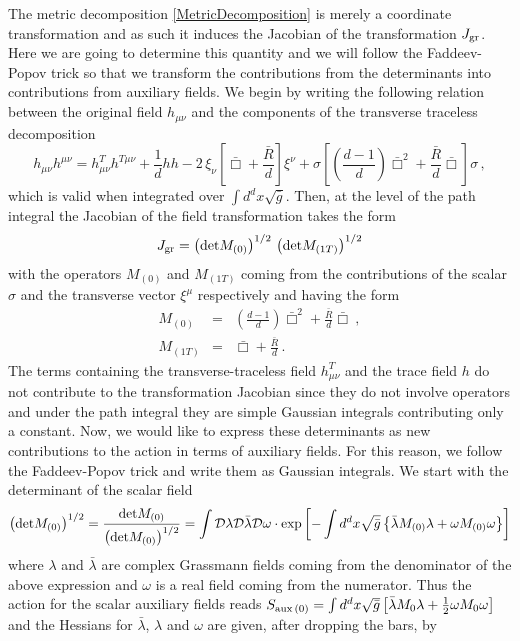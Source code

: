 \documentclass[notitlepage,eqsecnum,bm,amsmath,preprintnumbers,superscriptaddress,nofootinbib,aps,11pt]{revtex4-1}
\begin{document}
The metric decomposition \eqref{MetricDecomposition} is merely a coordinate transformation and as such it induces the Jacobian of the transformation $J_{\rm gr}$. Here we are going to determine this quantity and we will follow the Faddeev-Popov trick so that we transform the contributions from the determinants into contributions from auxiliary fields. We begin by writing the following relation between the original field $h_{\mu\nu}$ and the components of the transverse traceless decomposition 
\begin{equation}
h_{\mu\nu}h^{\mu\nu} = 
h^T_{\mu\nu}h^{T\mu\nu}+\frac{1}{d}hh - 2\,\xi_{\nu}\left[\bar \Box + \frac{\bar R}{d}\right]\xi^{\nu}+\sigma \left[\left(\frac{d-1}{d}\right)\bar \Box^2+\frac{\bar R}{d}\bar \Box\right]\sigma\,,
\end{equation}
which is valid when integrated over $\int d^dx \sqrt{\bar g}$. Then, at the level of the path integral the Jacobian of the field transformation takes the form
\begin{equation}
J_{\rm gr}=\left({\rm det} M_{(0)}\right)^{1/2}\,\left({\rm det} M_{(1T)}\right)^{1/2}
\end{equation}
with the operators $M_{(0)}$ and $M_{(1T)}$ coming from the contributions of the scalar $\sigma$ and the transverse vector $\xi^{\mu}$ respectively and having the form
\begin{eqnarray}
M_{(0)}&=&\left(\frac{d-1}{d}\right)\bar \Box^2+\frac{\bar R}{d}\bar \Box \ ,\\
M_{(1T)}&=&\bar \Box + \frac{\bar R}{d}\,.
\end{eqnarray}
The terms containing the transverse-traceless field $h^{T}_{\mu\nu}$ and the trace field $h$ do not contribute to the transformation Jacobian since they do not involve operators and under the path integral they are simple Gaussian integrals contributing only a constant. Now, we would like to express these determinants as new contributions to the action in terms of auxiliary fields. For this reason, we follow the Faddeev-Popov trick and write them as Gaussian integrals. We start with the determinant of the scalar field
\begin{equation}
\left({\rm det} M_{(0)}\right)^{1/2}=\frac{{\rm det} M_{(0)}}{\left({\rm det} M_{(0)}\right)^{1/2}}=\int \mathcal{D}\lambda\mathcal{D}\bar\lambda\mathcal{D}\omega\cdot\exp\left[-\int d^dx\sqrt{\bar g}\left\{\bar\lambda M_{(0)}\lambda+\omega M_{(0)}\omega\right\}\right]
\end{equation}
where $\lambda$ and $\bar\lambda$ are complex Grassmann fields coming from the denominator of the above expression and $\omega$ is a real field coming from the numerator. Thus the action for the scalar auxiliary fields reads $S_{\rm aux\,(0)}=\int d^dx\sqrt{\bar{g}}\left[\bar\lambda M_0\lambda+ \frac{1}{2}\omega M_0\omega\right]$ and the Hessians for $\bar\lambda$, $\lambda$ and $\omega$ are given, after dropping the bars, by
\end{document}
